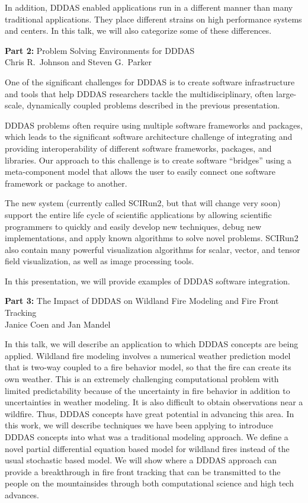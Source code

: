 \documentclass{report}
\begin{document}
In addition, DDDAS enabled applications run in a different
manner than many traditional applications.  They place
different strains on high performance systems and centers.
In this talk, we will also categorize some of these
differences.

{\bf Part 2:} Problem Solving Environments for DDDAS
\\
Chris R.~Johnson and Steven G.~Parker

One of the significant challenges for DDDAS is to create
software infrastructure and tools that help DDDAS
researchers tackle the multidisciplinary, often large-scale,
dynamically coupled problems described in the previous
presentation.

DDDAS problems often require using multiple software
frameworks and packages, which leads to the significant
software architecture challenge of integrating and providing
interoperability of different software frameworks, packages,
and libraries.  Our approach to this challenge is  to create
software ``bridges'' using a meta-component model that allows
the user to easily connect one software framework or package
to another.

The new system (currently called SCIRun2, but that will
change very soon) support the entire life cycle of
scientific applications by allowing scientific programmers
to quickly and easily develop new techniques, debug new
implementations, and apply known algorithms to solve novel
problems.  SCIRun2 also contain many powerful visualization
algorithms for scalar,  vector, and tensor field
visualization, as well as image processing tools.

In this presentation, we will provide examples of DDDAS
software integration.

{\bf Part 3:} The Impact of DDDAS on Wildland Fire Modeling and
Fire Front Tracking
\\
Janice Coen and Jan Mandel

In this talk, we will describe an application to which DDDAS
concepts are being applied.  Wildland fire modeling involves
a numerical weather prediction model that is two-way coupled
to a fire behavior model, so that the fire can create its
own weather.  This is an extremely challenging computational
problem with limited predictability because of the
uncertainty in fire behavior in addition to uncertainties in
weather modeling.  It is also difficult to obtain
observations near a wildfire.  Thus, DDDAS concepts have
great potential in advancing this area.  In this work, we
will describe techniques we have been applying to introduce
DDDAS concepts into what was a traditional modeling
approach.  We define a novel partial differential equation
based model for wildland fires instead of the usual
stochastic based model.  We will show where a DDDAS approach
can provide a breakthrough in fire front tracking that can
be transmitted to the people on the mountainsides through
both computational science and high tech advances.
\end{document}
